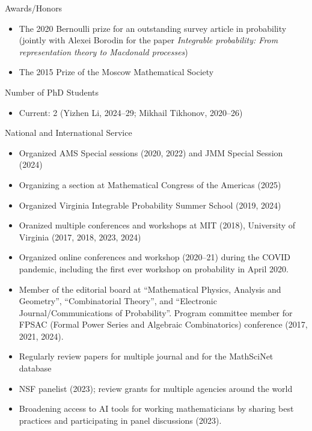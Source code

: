 \documentclass{amsart}
\begin{document}
\bigskip\noindent
{\sc Awards/Honors}

\begin{itemize}
\item The 2020 Bernoulli prize for an outstanding survey article in probability 
(jointly with Alexei Borodin for the paper \emph{Integrable probability: From representation theory to
Macdonald processes})
\item The 2015 Prize of the Moscow Mathematical Society
\end{itemize}

\bigskip\noindent
{\sc Number of PhD Students}

\begin{itemize}
\item Current: 2 (Yizhen Li, 2024--29; Mikhail Tikhonov, 2020--26)
\end{itemize}


\bigskip\noindent
{\sc National and International Service}

\begin{itemize}
\item Organized AMS Special sessions (2020, 2022) and JMM Special Session (2024)
\item Organizing a section at Mathematical Congress of the Americas (2025)
\item Organized Virginia Integrable Probability Summer School (2019, 2024)
\item Oranized multiple conferences and workshops at MIT (2018), University of Virginia (2017, 2018, 2023, 2024)
\item Organized online conferences and workshop (2020--21) during the COVID pandemic, including the first ever workshop on probability in April 2020.
\item Member of the editorial board at 
	``Mathematical Physics, Analysis and Geometry'', ``Combinatorial Theory'', and ``Electronic Journal/Communications of Probability''. Program committee member for FPSAC (Formal Power Series and Algebraic Combinatorics) conference (2017, 2021, 2024).
\item Regularly review papers for multiple journal and for the MathSciNet database
\item NSF panelist (2023); review grants for multiple agencies around the world
\item Broadening access to AI tools for working mathematicians by sharing best practices and participating in panel discussions (2023). 
\end{itemize}
\end{document}
